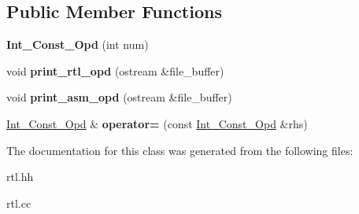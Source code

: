 \subsection*{Public Member Functions}
\begin{DoxyCompactItemize}
\item 
\mbox{\label{classInt__Const__Opd_ab26b1c8760cbff353bef314e81782d02}} 
{\bfseries Int\+\_\+\+Const\+\_\+\+Opd} (int num)
\item 
\mbox{\label{classInt__Const__Opd_af407563c29b85b7a42984a02c60d00ce}} 
void {\bfseries print\+\_\+rtl\+\_\+opd} (ostream \&file\+\_\+buffer)
\item 
\mbox{\label{classInt__Const__Opd_a3ad5d8f89abed16b3ebf5042ac6e3c48}} 
void {\bfseries print\+\_\+asm\+\_\+opd} (ostream \&file\+\_\+buffer)
\item 
\mbox{\label{classInt__Const__Opd_a3afbfd9248f657304ffdbcd9395e1b4a}} 
\hyperlink{classInt__Const__Opd}{Int\+\_\+\+Const\+\_\+\+Opd} \& {\bfseries operator=} (const \hyperlink{classInt__Const__Opd}{Int\+\_\+\+Const\+\_\+\+Opd} \&rhs)
\end{DoxyCompactItemize}


The documentation for this class was generated from the following files\+:\begin{DoxyCompactItemize}
\item 
rtl.\+hh\item 
rtl.\+cc\end{DoxyCompactItemize}
